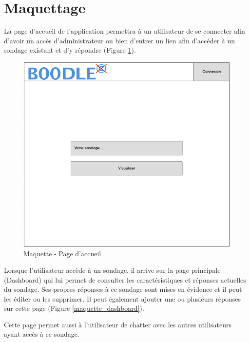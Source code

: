 \documentclass[]{report}
\begin{document}
\section{Maquettage}

La page d'accueil de l'application permettra à un utilisateur de se connecter afin d'avoir un accès d'administrateur ou bien d'entrer un lien afin d'accéder à un sondage existant et d'y répondre (Figure \ref{maquette_accueil}).

\begin{figure}[h]
	\caption{Maquette - Page d'accueil}
	\label{maquette_accueil}
	\centering
	\includegraphics[scale=0.7]{figures/maquettes/accueil.png}
\end{figure}

\par Lorsque l'utilisateur accède à un sondage, il arrive sur la page principale (Dashboard) qui lui permet de consulter les caractéristiques et réponses actuelles du sondage. Ses propres réponses à ce sondage sont mises en évidence et il peut les éditer ou les supprimer. Il peut également ajouter une ou plusieurs réponses sur cette page (Figure \ref{maquette_dashboard}).
\par Cette page permet aussi à l'utilisateur de chatter avec les autres utilisateurs ayant accès à ce sondage.
\end{document}
